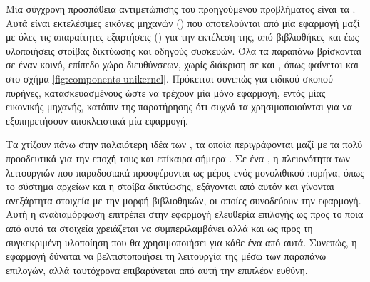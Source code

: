 Μία σύγχρονη προσπάθεια αντιμετώπισης του προηγούμενου προβλήματος είναι τα
 \cite{mirageos}. Αυτά είναι εκτελέσιμες εικόνες μηχανών
() που αποτελούνται από μία εφαρμογή μαζί με όλες τις
απαραίτητες εξαρτήσεις () για την εκτέλεση της, από βιβλιοθήκες
και  έως υλοποιήσεις στοίβας δικτύωσης και οδηγούς συσκευών.
Όλα τα παραπάνω βρίσκονται σε έναν κοινό, επίπεδο χώρο διευθύνσεων, χωρίς
διάκριση σε  και , όπως φαίνεται και στο σχήμα
\ref{fig:components-unikernel}. Πρόκειται συνεπώς για ειδικού σκοπού πυρήνες,
κατασκευασμένους ώστε να τρέχουν μία μόνο εφαρμογή, εντός μίας εικονικής
μηχανής, κατόπιν της παρατήρησης ότι συχνά τα 
χρησιμοποιούνται για να εξυπηρετήσουν αποκλειστικά μία εφαρμογή.

Τα  χτίζουν πάνω στην παλαιότερη ιδέα των , τα οποία περιγράφονται μαζί με τα πολύ προοδευτικά για την εποχή
τους και επίκαιρα σήμερα  \cite{exokernel}.
Σε ένα , η πλειονότητα των λειτουργιών που παραδοσιακά
προσφέρονται ως μέρος ενός μονολιθικού πυρήνα, όπως το σύστημα αρχείων και η
στοίβα δικτύωσης, εξάγονται από αυτόν και γίνονται ανεξάρτητα στοιχεία με την
μορφή βιβλιοθηκών, οι οποίες συνοδεύουν την εφαρμογή. Αυτή η αναδιαμόρφωση
επιτρέπει στην εφαρμογή ελευθερία επιλογής ως προς το ποια από αυτά τα στοιχεία
χρειάζεται να συμπεριλαμβάνει αλλά και ως προς τη συγκεκριμένη υλοποίηση που θα
χρησιμοποιήσει για κάθε ένα από αυτά. Συνεπώς, η εφαρμογή δύναται να
βελτιστοποιήσει τη λειτουργία της μέσω των παραπάνω επιλογών, αλλά ταυτόχρονα
επιβαρύνεται από αυτή την επιπλέον ευθύνη.

